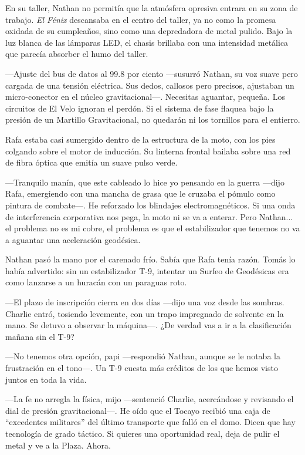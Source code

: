 \documentclass[12pt,a4paper]{book}
\begin{document}
En su taller, Nathan no permitía que la atmósfera opresiva entrara en su zona de trabajo. \textit{El Fénix} descansaba en el centro del taller, ya no como la promesa oxidada de su cumpleaños, sino como una depredadora de metal pulido. Bajo la luz blanca de las lámparas LED, el chasis brillaba con una intensidad metálica que parecía absorber el humo del taller.

---Ajuste del bus de datos al 99.8 por ciento ---susurró Nathan, su voz suave pero cargada de una tensión eléctrica. Sus dedos, callosos pero precisos, ajustaban un micro-conector en el núcleo gravitacional---. Necesitas aguantar, pequeña. Los circuitos de El Velo ignoran el perdón. Si el sistema de fase flaquea bajo la presión de un Martillo Gravitacional, no quedarán ni los tornillos para el entierro.

Rafa estaba casi sumergido dentro de la estructura de la moto, con los pies colgando sobre el motor de inducción. Su linterna frontal bailaba sobre una red de fibra óptica que emitía un suave pulso verde.

---Tranquilo manín, que este cableado lo hice yo pensando en la guerra ---dijo Rafa, emergiendo con una mancha de grasa que le cruzaba el pómulo como pintura de combate---. He reforzado los blindajes electromagnéticos. Si una onda de interferencia corporativa nos pega, la moto ni se va a enterar. Pero Nathan... el problema no es mi cobre, el problema es que el estabilizador que tenemos no va a aguantar una aceleración geodésica.

Nathan pasó la mano por el carenado frío. Sabía que Rafa tenía razón. Tomás lo había advertido: sin un estabilizador T-9, intentar un Surfeo de Geodésicas era como lanzarse a un huracán con un paraguas roto.

---El plazo de inscripción cierra en dos días ---dijo una voz desde las sombras. Charlie entró, tosiendo levemente, con un trapo impregnado de solvente en la mano. Se detuvo a observar la máquina---. ¿De verdad vas a ir a la clasificación mañana sin el T-9?

---No tenemos otra opción, papi ---respondió Nathan, aunque se le notaba la frustración en el tono---. Un T-9 cuesta más créditos de los que hemos visto juntos en toda la vida.

---La fe no arregla la física, mijo ---sentenció Charlie, acercándose y revisando el dial de presión gravitacional---. He oído que el Tocayo recibió una caja de ``excedentes militares'' del último transporte que falló en el domo. Dicen que hay tecnología de grado táctico. Si quieres una oportunidad real, deja de pulir el metal y ve a la Plaza. Ahora.
\end{document}
